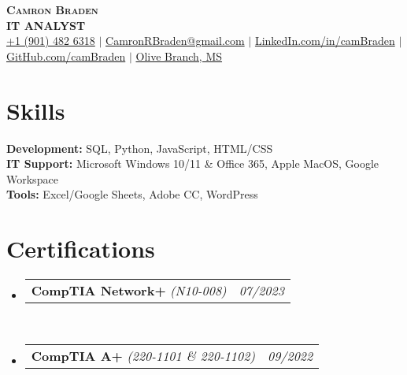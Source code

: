 \documentclass[letterpaper,10pt]{article}
\makeatletter
\newcommand{\resumeOrganizationHeading}[3]{
	\vspace{-2pt}\item
	\begin{tabular*}{0.97\textwidth}[t]{l@{\extracolsep{\fill}}r}
		\textbf{#1} \textit{\small #2} & \textit{\small#3}
	\end{tabular*}\vspace{-7pt}
}
\newcommand{\resumeSubHeadingListStart}{\begin{itemize}[leftmargin=0.15in, label={}]}
\newcommand{\resumeSubHeadingListEnd}{\end{itemize}}
\makeatother
\begin{document}
\begin{center}
	\textbf{\Huge \scshape Camron Braden \\ \vspace{2pt} \normalsize IT ANALYST} \\ \vspace{2pt}
	\small \href{tel:901482638}{+1 (901) 482 6318} $|$ \href{mailto:camronrbraden@gmail.com}{CamronRBraden@gmail.com} $|$  \href{https://www.linkedin.com/in/cambraden/}{LinkedIn.com/in/camBraden} $|$ \href{http://github.com/camBraden}{GitHub.com/camBraden} $|$ \href{https://goo.gl/maps/cEZ8epnCLyXyiohs8}{Olive Branch, MS}    
\end{center}

\section{\textbf Skills}
	\resumeSubHeadingListStart
	\small{\item{
		\textbf{Development:}{ SQL, Python, JavaScript, HTML/CSS} \\ \vspace{3pt}
		\textbf{IT Support:}{ Microsoft Windows 10/11 \& Office 365, Apple MacOS, Google Workspace} \\ \vspace{3pt}
		\textbf{Tools:}{  Excel/Google Sheets, Adobe CC, WordPress} \\ \vspace{3pt}
	}}
	\resumeSubHeadingListEnd     

\section{\textbf Certifications}
	\resumeSubHeadingListStart
		\small \resumeOrganizationHeading {CompTIA Network+}{(N10-008)}{07/2023}
		\\ \vspace{7pt}
		\small \resumeOrganizationHeading {CompTIA A+}{(220-1101 \& 220-1102)}{09/2022}
	\resumeSubHeadingListEnd
\end{document}

